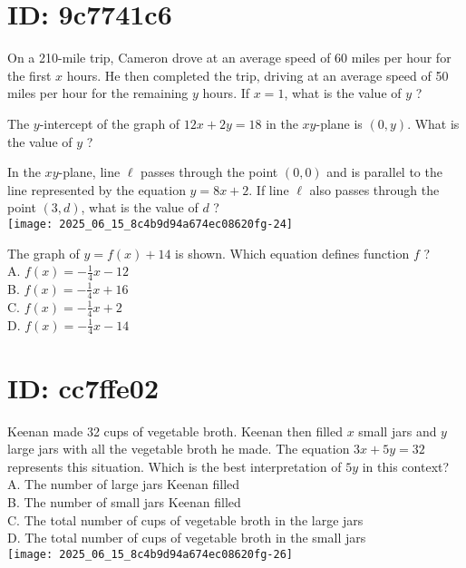 




























\section*{ID: 9c7741c6}
On a 210-mile trip, Cameron drove at an average speed of 60 miles per hour for the first $x$ hours. He then completed the trip, driving at an average speed of 50 miles per hour for the remaining $y$ hours. If $x=1$, what is the value of $y$ ?

The $y$-intercept of the graph of $12 x+2 y=18$ in the $x y$-plane is $(0, y)$. What is the value of $y$ ?

In the $x y$-plane, line $\ell$ passes through the point $(0,0)$ and is parallel to the line represented by the equation $y=8 x+2$. If line $\ell$ also passes through the point $(3, d)$, what is the value of $d$ ?\\
\texttt{[image: 2025\_06\_15\_8c4b9d94a674ec08620fg-24]}

The graph of $y=f(x)+14$ is shown. Which equation defines function $f$ ?\\
A. $f(x)=-\frac{1}{4} x-12$\\
B. $f(x)=-\frac{1}{4} x+16$\\
C. $f(x)=-\frac{1}{4} x+2$\\
D. $f(x)=-\frac{1}{4} x-14$

\section*{ID: cc7ffe02}
Keenan made 32 cups of vegetable broth. Keenan then filled $x$ small jars and $y$ large jars with all the vegetable broth he made. The equation $3 x+5 y=32$ represents this situation. Which is the best interpretation of $5 y$ in this context?\\
A. The number of large jars Keenan filled\\
B. The number of small jars Keenan filled\\
C. The total number of cups of vegetable broth in the large jars\\
D. The total number of cups of vegetable broth in the small jars\\
\texttt{[image: 2025\_06\_15\_8c4b9d94a674ec08620fg-26]}

